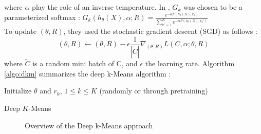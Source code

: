 where $\alpha$ play the role of an inverse temperature. In \cite{Deap-K-Means}
, $G_{k}$ was chosen to be a parameterized softmax : 
$G_{k}(h_\theta(X), \alpha; R) = \frac{e^{-\alpha F(h_\theta(X),r_k)}}
{\sum\limits_{k' = 1}^K e^{-\alpha F(h_\theta(X),r_k')}}$\\
To update $(\theta, R)$, they used the stochastic gradient descent (SGD)
as follows :
\begin{equation}
  (\theta, R) \gets (\theta, R) - \epsilon \frac{1}{|\widetilde{C}|}
  \nabla_{(\theta, R)} L(C, \alpha; \theta, R)
\end{equation}
where $\widetilde{C}$ is a random mini batch of C, and $\epsilon$ the
learning rate.
Algorithm \ref{algo:dkm} summarizes the deep k-Means algorithm :
\begin{algorithm}[!h]
  Initialize $\theta$ and $r_k$, $1 \leq k \leq K$ (randomly or through 
  pretraining)\\
  \caption{\label{algo:dkm}Deep $K$-Means}
\end{algorithm}
\begin{figure}
  \centering
  \caption{Overview of the Deep k-Means approach}
  \label{fig:approach_dkm}
\end{figure}
